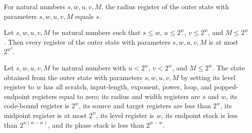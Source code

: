 \begin{lemma}
\label{Complexity.LogProg.SavitchARM.outerSt_s}
\leanok
{}
For natural numbers $s,w,u,v,M$, the radius register of the outer state with parameters
$s,w,u,v,M$ equals $s$.
\end{lemma}

\begin{lemma}
\label{Complexity.LogProg.SavitchARM.outerSt_bd}
\leanok
{}
Let $s,w,u,v,M$ be natural numbers such that $s\le w$, $u\le 2^w$, $v\le 2^w$, and $M\le
2^w$. Then every register of the outer state with parameters $s,w,u,v,M$ is at most
$2^{w^2}$.
\end{lemma}

\begin{lemma}
\label{Complexity.LogProg.SavitchARM.outerSt_inv}
\leanok
{}
Let $s,w,u,v,M$ be natural numbers with $u<2^w$, $v<2^w$, and $M\le 2^w$. The state
obtained from the outer state with parameters $s,w,u,v,M$ by setting its level register
to $w$ has all scratch, input-length, exponent, power, loop, and popped-endpoint
registers equal to zero; its radius and width registers are $s$ and $w$, its code-bound
register is $2^w$, its source and target registers are less than $2^w$, its midpoint
register is at most $2^w$, its level register is $w$, its endpoint stack is less than
$2^{w(w-w)}$, and its phase stack is less than $2^{w-w}$.
\end{lemma}

